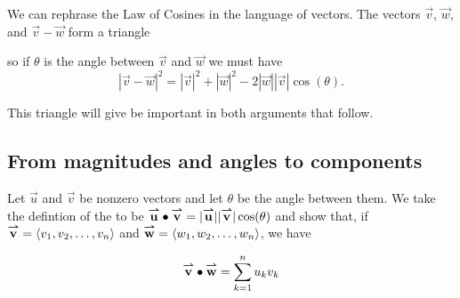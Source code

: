 \documentclass{ximera}
\begin{document}
We can rephrase the Law of Cosines in the language of vectors.  The
vectors $\vec{v}$, $\vec{w}$, and $\vec{v} - \vec{w}$ form a triangle
\begin{image}
\end{image}
so if $\theta$ is the angle between $\vec{v}$ and $\vec{w}$ we must
have
\[
|\vec{v} - \vec{w}|^2=|\vec{v}|^2+|\vec{w}|^2-2|\vec{w}||\vec{v}|\cos(\theta).
\]

This triangle will give be important in both arguments that follow.

\subsection{From magnitudes and angles to components}
Let $\vec{u}$ and $\vec{v}$ be nonzero vectors and let $\theta$ be the angle between them.  We take the defintion of the  to be ${\overset{\boldsymbol{\rightharpoonup}}{\mathbf{u}}} \bullet {\overset{\boldsymbol{\rightharpoonup}}{\mathbf{v}}} = |{\overset{\boldsymbol{\rightharpoonup}}{\mathbf{u}}}||{\overset{\boldsymbol{\rightharpoonup}}{\mathbf{v}}}|\cos(\theta)$ and show that, if ${\overset{\boldsymbol{\rightharpoonup}}{\mathbf{v}}} =  \left\langle v_1,v_2,\ldots,v_n\right\rangle$ and ${\overset{\boldsymbol{\rightharpoonup}}{\mathbf{w}}} =  \left\langle w_1,w_2,\ldots,w_n\right\rangle$, we have
 
  \[
  {\overset{\boldsymbol{\rightharpoonup}}{\mathbf{v}}} \bullet {\overset{\boldsymbol{\rightharpoonup}}{\mathbf{w}}} = \sum_{k=1}^n u_kv_k
  \]
\end{document}
